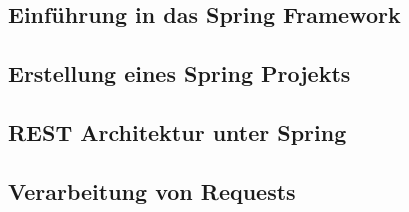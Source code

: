 \subsection{Einführung in das Spring Framework}
    \label{Einführung in das Spring Framework}
    
\pagebreak

\subsection{Erstellung eines Spring Projekts}
  \label{Erstellung eines Spring Projekts}
  
\pagebreak

\subsection{REST Architektur unter Spring}
  \label{REST Architektur unter Spring}
  
\pagebreak

\subsection{Verarbeitung von Requests}
  \label{Verarbeitung von Requests}
  
\pagebreak